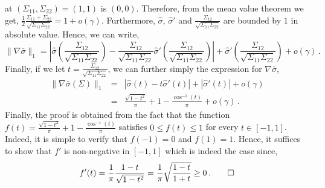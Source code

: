 at $(\Sigma_{11},\Sigma_{22})=(1,1)$ is $(0,0)$. Therefore, from the mean
value theorem we get,
$\frac{1}{2}\frac{\Sigma_{11}+\Sigma_{22}}{\sqrt{\Sigma_{11}\Sigma_{22}}} =
	1+o(\gamma)$.
Furthermore, $\hat\sigma$, $\hat\sigma'$ and
$\frac{\Sigma_{12}}{\sqrt{\Sigma_{11}\Sigma_{22}}}$ are bounded by $1$ in
absolute value. Hence, we can write,
\[
\|\nabla \bar \sigma\|_1 =
\left|
\hat\sigma\!\left(\frac{\Sigma_{12}}{\sqrt{\Sigma_{11}\Sigma_{22}}}\right) -
\frac{\Sigma_{12}}{\sqrt{\Sigma_{11}\Sigma_{22}}}
\hat\sigma'\!\left(\frac{\Sigma_{12}}{\sqrt{\Sigma_{11}\Sigma_{22}}}\right)
\right| +
\hat\sigma'\!\left(\frac{\Sigma_{12}}{\sqrt{\Sigma_{11}\Sigma_{22}}}\right)
+ o(\gamma) \,.
\]
Finally, if we let $t=\frac{\Sigma_{12}}{\sqrt{\Sigma_{11}\Sigma_{22}}}$,
we can further simply the expression for $\nabla\bar\sigma$,
\begin{eqnarray*}
\|\nabla \bar \sigma(\Sigma)\|_1 &=& |\hat\sigma(t)-t\hat\sigma'(t)| + |\hat\sigma'(t)|  + o(\gamma)
\\
&=& \frac{\sqrt{1-t^2}}{\pi} + 1 - \frac{\cos^{-1}(t)}{\pi}  + o(\gamma) \,.
\end{eqnarray*}
Finally, the proof is obtained from the fact that the function $f(t)=\frac{\sqrt{1-t^2}}{\pi} + 1 - \frac{\cos^{-1}(t)}{\pi}$ satisfies $0\le f(t)\le 1$ for every $t\in [-1,1]$.
Indeed, it is simple to verify that $f(-1)=0$ and $f(1)=1$. Hence, it suffices to
show that $f'$ is non-negative in $[-1,1]$ which is indeed the case since,
\[
f'(t) = \frac{1}{\pi}\frac{1-t}{\sqrt{1-t^2}} =
	\frac{1}{\pi}\sqrt{\frac{1-t}{1+t}} \ge 0 \,. \qedhere
\]

